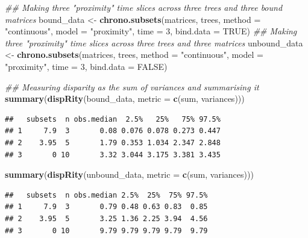 \documentclass[]{book}
\newenvironment{Shaded}{\begin{snugshade}}{\end{snugshade}}
\newcommand{\CommentTok}[1]{\textcolor[rgb]{0.56,0.35,0.01}{\textit{#1}}}
\newcommand{\DataTypeTok}[1]{\textcolor[rgb]{0.13,0.29,0.53}{#1}}
\newcommand{\DecValTok}[1]{\textcolor[rgb]{0.00,0.00,0.81}{#1}}
\newcommand{\KeywordTok}[1]{\textcolor[rgb]{0.13,0.29,0.53}{\textbf{#1}}}
\newcommand{\NormalTok}[1]{#1}
\newcommand{\OtherTok}[1]{\textcolor[rgb]{0.56,0.35,0.01}{#1}}
\newcommand{\StringTok}[1]{\textcolor[rgb]{0.31,0.60,0.02}{#1}}
\begin{document}
\begin{Shaded}
\begin{Highlighting}[]
\CommentTok{## Making three "proximity" time slices across three trees and three bound matrices}
\NormalTok{bound_data <-}\StringTok{ }\KeywordTok{chrono.subsets}\NormalTok{(matrices, trees,}
                             \DataTypeTok{method =} \StringTok{"continuous"}\NormalTok{,}
                             \DataTypeTok{model =} \StringTok{"proximity"}\NormalTok{,}
                             \DataTypeTok{time =} \DecValTok{3}\NormalTok{,}
                             \DataTypeTok{bind.data =} \OtherTok{TRUE}\NormalTok{)}
\CommentTok{## Making three "proximity" time slices across three trees and three matrices}
\NormalTok{unbound_data <-}\StringTok{ }\KeywordTok{chrono.subsets}\NormalTok{(matrices, trees,}
                               \DataTypeTok{method =} \StringTok{"continuous"}\NormalTok{,}
                               \DataTypeTok{model =} \StringTok{"proximity"}\NormalTok{,}
                               \DataTypeTok{time =} \DecValTok{3}\NormalTok{,}
                               \DataTypeTok{bind.data =} \OtherTok{FALSE}\NormalTok{)}

\CommentTok{## Measuring disparity as the sum of variances and summarising it}
\KeywordTok{summary}\NormalTok{(}\KeywordTok{dispRity}\NormalTok{(bound_data, }\DataTypeTok{metric =} \KeywordTok{c}\NormalTok{(sum, variances)))}
\end{Highlighting}
\end{Shaded}

\begin{verbatim}
##   subsets  n obs.median  2.5%   25%   75% 97.5%
## 1     7.9  3       0.08 0.076 0.078 0.273 0.447
## 2    3.95  5       1.79 0.353 1.034 2.347 2.848
## 3       0 10       3.32 3.044 3.175 3.381 3.435
\end{verbatim}

\begin{Shaded}
\begin{Highlighting}[]
\KeywordTok{summary}\NormalTok{(}\KeywordTok{dispRity}\NormalTok{(unbound_data, }\DataTypeTok{metric =} \KeywordTok{c}\NormalTok{(sum, variances)))}
\end{Highlighting}
\end{Shaded}

\begin{verbatim}
##   subsets  n obs.median 2.5%  25%  75% 97.5%
## 1     7.9  3       0.79 0.48 0.63 0.83  0.85
## 2    3.95  5       3.25 1.36 2.25 3.94  4.56
## 3       0 10       9.79 9.79 9.79 9.79  9.79
\end{verbatim}
\end{document}
